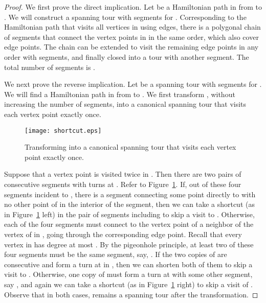 \documentclass[letterpaper,11pt]{article}
\begin{document}
\begin{proof}
We first prove the direct implication.
Let  be a Hamiltonian path in  from  to .
We will construct a spanning tour with  segments for .
Corresponding to the Hamiltonian path 
that visits all  vertices in  using  edges,
there is a polygonal chain of  segments
that connect the  vertex points in  in the same order,
which also cover  edge points.
The chain can be extended to visit the remaining  edge points
in any order with  segments,
and finally closed into a tour with another segment.
The total number of segments is .

We next prove the reverse implication.
Let  be a spanning tour with  segments for .
We will find a Hamiltonian path in  from  to .
We first transform ,
without increasing the number of segments,
into a canonical spanning tour that visits each vertex point exactly once.

\begin{figure}[htb]
\centering\texttt{[image: shortcut.eps]}
\caption{Transforming  into a canonical spanning tour that visits each
vertex point exactly once.}
\label{fig:shortcut}
\end{figure}

Suppose that a vertex point  is visited twice in .
Then there are two pairs of consecutive segments with turns at .
Refer to Figure~\ref{fig:shortcut}.
If, out of these four segments incident to ,
there is a segment connecting some point  directly to 
with no other point of  in the interior of the segment,
then we can take a shortcut (as in Figure~\ref{fig:shortcut} left)
in the pair of segments including  to skip a visit to .
Otherwise, each of the four segments must connect  to the vertex
point of a neighbor of the vertex of  in ,
going through the corresponding edge point.
Recall that every vertex in  has degree at most .
By the pigeonhole principle,
at least two of these four segments must be the same segment, say, .
If the two copies of  are consecutive
and form a turn at  in ,
then we can shorten both of them to skip a visit to .
Otherwise,
one copy of  must form a turn at 
with some other segment, say ,
and again we can take a shortcut (as in Figure~\ref{fig:shortcut} right)
to skip a visit of .
Observe that in both cases,
 remains a spanning tour after the transformation.


\end{proof}
\end{document}
